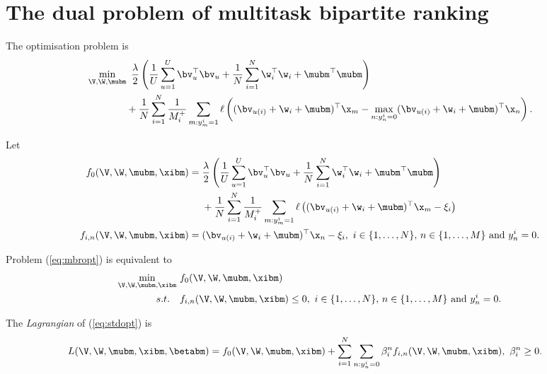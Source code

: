 \section{The dual problem of multitask bipartite ranking}

The optimisation problem is
\begin{equation}
\label{eq:mbropt}
\begin{aligned}
&\min_{\V, \W, \mubm} \ \frac{\lambda}{2} \left( \frac{1}{U} \sum_{u=1}^U \bv_u^\top \bv_u 
     + \frac{1}{N} \sum_{i=1}^N \w_i^\top \w_i + \mubm^\top \mubm \right) \\
& \hspace{4em}
     + \frac{1}{N} \sum_{i=1}^N \frac{1}{M_i^+} \sum_{m: y_m^i = 1} \ell \left( (\bv_{u(i)} + \w_i + \mubm)^\top \x_m 
     - \max_{n: y_n^i = 0} (\bv_{u(i)} + \w_i + \mubm)^\top \x_n \right).
\end{aligned}
\end{equation}

Let 
\begin{equation*}
\begin{aligned}
f_0(\V, \W, \mubm, \xibm) &= \frac{\lambda}{2} \left( \frac{1}{U} \sum_{u=1}^U \bv_u^\top \bv_u 
     + \frac{1}{N} \sum_{i=1}^N \w_i^\top \w_i + \mubm^\top \mubm \right) \\
& \quad \ 
     + \frac{1}{N} \sum_{i=1}^N \frac{1}{M_i^+} \sum_{m: y_m^i = 1} 
       \ell \left( (\bv_{u(i)} + \w_i + \mubm)^\top \x_m - \xi_i \right) \\
f_{i,n} (\V, \W, \mubm, \xibm) &= (\bv_{u(i)} + \w_i + \mubm)^\top \x_n - \xi_i, \
i \in \{1,\dots,N\}, \, n \in \{1,\dots,M\} \ \mathrm{and} \ y_n^i = 0.
\end{aligned}
\end{equation*}

Problem (\ref{eq:mbropt}) is equivalent to 
\begin{equation}
\label{eq:stdopt}
\begin{aligned}
\min_{\V, \W, \mubm, \xibm} \ & f_0(\V, \W, \mubm, \xibm) \\
s.t. \quad & f_{i,n}(\V, \W, \mubm, \xibm) \le 0, \
i \in \{1,\dots,N\}, \, n \in \{1,\dots,M\} \ \mathrm{and} \ y_n^i = 0.
\end{aligned}
\end{equation}

The \emph{Lagrangian} of (\ref{eq:stdopt}) is
\begin{equation*}
\begin{aligned}
L(\V, \W, \mubm, \xibm, \betabm) 
&= f_0(\V, \W, \mubm, \xibm) + \sum_{i=1}^N \sum_{n: y_n^i = 0} \beta_i^n f_{i,n} (\V, \W, \mubm, \xibm), \
\beta_i^n \ge 0.
\end{aligned}
\end{equation*}

